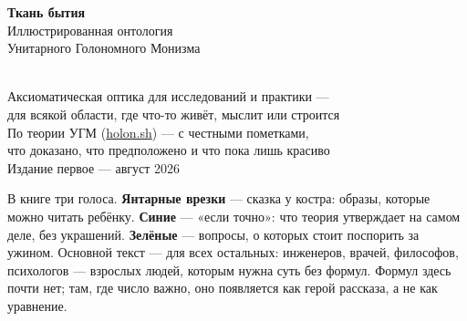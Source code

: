 \documentclass[11pt,letterpaper]{article}
\newcommand{\holonsh}{\href{https://holon.sh}{holon.sh}\xspace}
\begin{document}
\begin{titlepage}
\centering
\vspace*{28pt}
{\Huge\bfseries Ткань бытия}\\[10pt]
{\LARGE Иллюстрированная онтология\\[3pt] Унитарного Голономного Монизма}\\[26pt]
\\[26pt]
{\large Аксиоматическая оптика для исследований и практики ---\\
для всякой области, где что-то живёт, мыслит или строится}\\[18pt]
{\small\color{plosgray} По теории УГМ (\holonsh) --- с честными пометками,\\
что доказано, что предположено и что пока лишь красиво}\\[10pt]
{\small\color{plosgray} Издание первое --- август 2026}
\vfill
\begin{skazbox}
В книге три голоса. \textcolor{ember}{\textbf{Янтарные врезки}} --- сказка у
костра: образы, которые можно читать ребёнку. \textcolor{fact}{\textbf{Синие}}
--- «если точно»: что теория утверждает на самом деле, без украшений.
\textcolor{leaf}{\textbf{Зелёные}} --- вопросы, о которых стоит поспорить за
ужином. Основной текст --- для всех остальных: инженеров, врачей, философов,
психологов --- взрослых людей, которым нужна суть без формул. Формул здесь
почти нет; там, где число важно, оно появляется как герой рассказа, а не как
уравнение.
\end{skazbox}
\end{titlepage}
\end{document}
